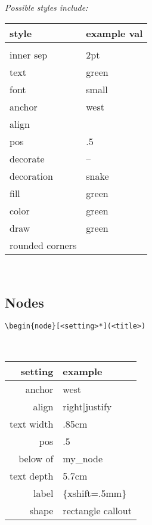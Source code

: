 \textit{Possible styles include: } \\
\begin{tabularx}{5cm}{l l}
    style & example val \\
    \hline \\
    inner sep & 2pt\\
    text & green \\
    font & small \\
    anchor & west \\
    align & \\
    pos & .5 \\
    decorate & --\\
    decoration & snake \\
    fill & green \\
    color & green\\
    draw & green \\
    rounded corners & \\
\end{tabularx} \ \\ 
\vspace{2mm}

\subsection*{Nodes}
\begin{code}{6.5}
\begin{lstlisting}
\begin{node}[<setting>*](<title>)
\end{lstlisting}
\end{code} \\
\begin{tabularx}{4cm}{r l}
    setting & example \\
    \hline
    anchor & west \\
    align & right|justify \\
    text width & .85cm \\
    pos & .5 \\
    below of & my\_node \\
    text depth & 5.7cm \\
    label & \{xshift=.5mm\} \\
    shape & rectangle callout \\ 
\end{tabularx} \ \\
\vspace{2mm}

